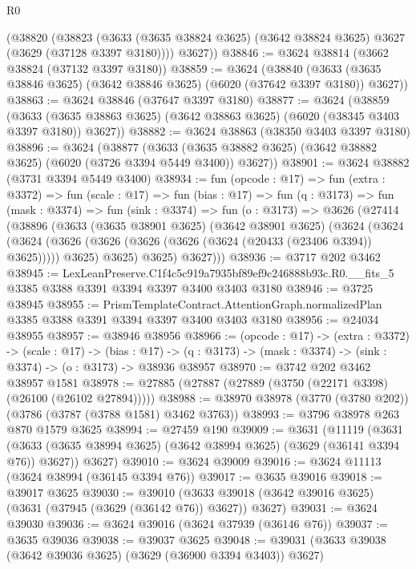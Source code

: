 \begin{lexlean}{R0}
\begin{coremodule}
      (@38820
        (@38823
          (@3633 (@3635 @38824 @3625) (@3642 @38824 @3625) @3627 (@3629 (@37128 @3397 @3180))))
        @3627))
@38846 := @3624 @38814 (@3662 @38824 (@37132 @3397 @3180))
@38859 := @3624
    (@38840 (@3633 (@3635 @38846 @3625) (@3642 @38846 @3625) (@6020 (@37642 @3397 @3180)) @3627))
@38863 := @3624 @38846 (@37647 @3397 @3180)
@38877 := @3624
    (@38859
      (@3633 (@3635 @38863 @3625) (@3642 @38863 @3625) (@6020 (@38345 @3403 @3397 @3180)) @3627))
@38882 := @3624 @38863 (@38350 @3403 @3397 @3180)
@38896 := @3624
    (@38877
      (@3633 (@3635 @38882 @3625) (@3642 @38882 @3625) (@6020 (@3726 @3394 @5449 @3400)) @3627))
@38901 := @3624 @38882 (@3731 @3394 @5449 @3400)
@38934 := fun (opcode : @17) =>
  fun (extra : @3372) =>
  fun (scale : @17) =>
  fun (bias : @17) =>
  fun (q : @3173) =>
  fun (mask : @3374) =>
  fun (sink : @3374) =>
  fun (o : @3173) =>
  @3626
    (@27414
      (@38896
        (@3633
          (@3635 @38901 @3625)
          (@3642 @38901 @3625)
          (@3624
            (@3624
              (@3624 (@3626 (@3626 (@3626 (@3626 (@3624 (@20433 (@23406 @3394)) @3625))))) @3625)
              @3625)
            @3625)
          @3627)))
@38936 := @3717 @202 @3462
@38945 := LexLeanPreserve.C1f4c5c919a7935bf89ef9c246888b93c.R0.__fits_5
    @3385
    @3388
    @3391
    @3394
    @3397
    @3400
    @3403
    @3180
@38946 := @3725 @38945
@38955 := PrismTemplateContract.AttentionGraph.normalizedPlan
    @3385
    @3388
    @3391
    @3394
    @3397
    @3400
    @3403
    @3180
@38956 := @24034 @38955
@38957 := @38946 @38956
@38966 := (opcode : @17) ->
  (extra : @3372) ->
  (scale : @17) ->
  (bias : @17) -> (q : @3173) -> (mask : @3374) -> (sink : @3374) -> (o : @3173) -> @38936 @38957
@38970 := @3742 @202 @3462 @38957 @1581
@38978 := @27885 (@27887 (@27889 (@3750 (@22171 @3398) (@26100 (@26102 @27894)))))
@38988 := @38970 @38978 (@3770 (@3780 @202)) (@3786 (@3787 (@3788 @1581) @3462 @3763))
@38993 := @3796 @38978 @263 @870 @1579 @3625
@38994 := @27459 @190
@39009 := @3631
    (@11119
      (@3631 (@3633 (@3635 @38994 @3625) (@3642 @38994 @3625) (@3629 (@36141 @3394 @76)) @3627))
      @3627)
@39010 := @3624 @39009
@39016 := @3624 @11113 (@3624 @38994 (@36145 @3394 @76))
@39017 := @3635 @39016
@39018 := @39017 @3625
@39030 := @39010
    (@3633 @39018 (@3642 @39016 @3625) (@3631 (@37945 (@3629 (@36142 @76)) @3627)) @3627)
@39031 := @3624 @39030
@39036 := @3624 @39016 (@3624 @37939 (@36146 @76))
@39037 := @3635 @39036
@39038 := @39037 @3625
@39048 := @39031 (@3633 @39038 (@3642 @39036 @3625) (@3629 (@36900 @3394 @3403)) @3627)

\end{coremodule}
\end{lexlean}
